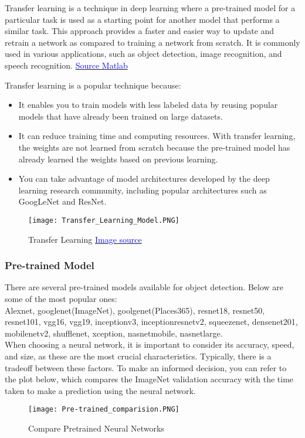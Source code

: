 Transfer learning is a technique in deep learning where a pre-trained model for a particular task is used as a starting point for another model that performs a similar task. This approach provides a faster and easier way to update and retrain a network as compared to training a network from scratch. It is commonly used in various applications, such as object detection, image recognition, and speech recognition. \cite{you2021logme}
\href{https://www.mathworks.com/discovery/transfer-learning.html?s_tid=srchtitle_support_results_1_Transfer%2520Learning}{\textcolor{blue}{Source Matlab}}

Transfer learning is a popular technique because:
\begin{itemize}
    \item It enables you to train models with less labeled data by reusing popular models that have already been trained on large datasets.
    \item  It can reduce training time and computing resources. With transfer learning, the weights are not learned from scratch because the pre-trained model has already learned the weights based on previous learning.
    \item You can take advantage of model architectures developed by the deep learning research community, including popular architectures such as GoogLeNet and ResNet.
\end{itemize}
\begin{figure}[H]
    \centering\texttt{[image: Transfer\_Learning\_Model.PNG]}
    \caption{Transfer Learning \protect\href{https://www.mathworks.com/help/deeplearning/ug/pretrained-convolutional-neural-networks.html}{\textcolor{blue}{Image source}}}
    \label{fig:Transfer Learning}
\end{figure}
\subsubsection{Pre-trained Model}
There are several pre-trained models available for object detection. Below are some of the most popular ones:\\
Alexnet, googlenet(ImageNet), goolgenet(Places365), resnet18, resnet50, resnet101, vgg16, vgg19, inceptionv3, inceptionresnetv2, squeezenet, densenet201, mobilenetv2, shufflenet, xception, nasnetmobile, nasnetlarge. \\

When choosing a neural network, it is important to consider its accuracy, speed, and size, as these are the most crucial characteristics. Typically, there is a tradeoff between these factors. To make an informed decision, you can refer to the plot below, which compares the ImageNet validation accuracy with the time taken to make a prediction using the neural network. \cite{li2019analysis}
\begin{figure}[H]
    \centering
    \texttt{[image: Pre-trained\_comparision.PNG]}
    \caption{Compare Pretrained Neural Networks}
    \label{fig: Pretrained Model Comparison}
\end{figure}

